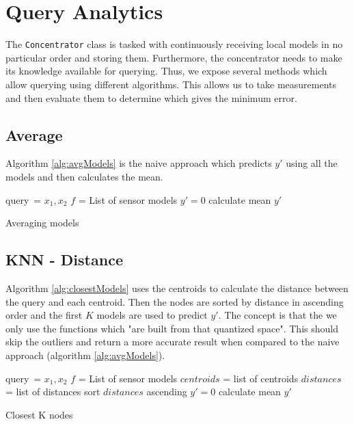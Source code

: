 \documentclass{mproj}
\begin{document}
\section{Query Analytics}
\label{sec:queryAnalytics}
The \texttt{Concentrator} class is tasked with continuously receiving local models in no particular order and storing them. Furthermore, the concentrator needs to make its knowledge available for querying. Thus, we expose several methods which allow querying using different algorithms. This allows us to take measurements and then evaluate them to determine which gives the minimum error. 

\subsection{Average}
Algorithm \ref{alg:avgModels} is the naive approach which predicts $y'$ using all the models and then calculates the mean.

\begin{algorithm}[H]
 query\ = $x_1,x_2$\; 
 $f$ = List of sensor models\;
 $y'=0$\;
 calculate mean $y'$
 \caption{Averaging models}
 \label{alg:avgModels}
\end{algorithm}

\subsection{KNN - Distance}
Algorithm \ref{alg:closestModels} uses the centroids to calculate the distance between the query and each centroid. Then the nodes are sorted by distance in ascending order and the first $K$ models are used to predict $y'$. The concept is that the we only use the functions which "are built from that quantized space". This should skip the outliers and return a more accurate result when compared to the naive approach (algorithm \ref{alg:avgModels}).

\begin{algorithm}[H]
 query\ = $x_1,x_2$\;
 $f$ = List of sensor models\;
 $centroids$ = list of centroids\;
 $distances$ = list of distances\;
 sort $distances$ ascending\;
 $y'=0$\;
 calculate mean $y'$\;
 \caption{Closest K nodes}
 \label{alg:closestModels}
\end{algorithm}
\end{document}
